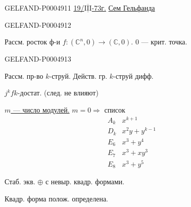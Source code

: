 \begin{GelfandAdjacentEvidence}{GELFAND-P000491}{1}
\uline{19/\mbox{$\overline{\underline{\mathrm{III}}}$}-73г.}
\qquad\uline{Сем Гельфанда}
\end{GelfandAdjacentEvidence}
\begin{GelfandAdjacentEvidence}{GELFAND-P000491}{2}


\quad Рассм. росток ф-и $f:(\mathbb C^n,0)\longrightarrow(\mathbb C,0)$.
$0$ — крит. точка.
\end{GelfandAdjacentEvidence}
\begin{GelfandAdjacentEvidence}{GELFAND-P000491}{3}


Рассм. пр-во $k$-струй. Действ. гр. $k$-струй дифф.

$j^k f$\qquad $k$-достат. (след. не влияют)

\uline{\mbox{$m$} — число модулей.}
\quad $m=0\Longrightarrow$ список
\[
\begin{array}{ll}
A_k & x^{k+1}\\
D_k & x^2y+y^{k-1}\\
E_6 & x^3+y^4\\
E_7 & x^3+xy^3\\
E_8 & x^3+y^5
\end{array}
\]
\end{GelfandAdjacentEvidence}


Стаб. экв. \quad $\oplus$ с невыр. квадр. формами.

Квадр. форма полож. определена.


